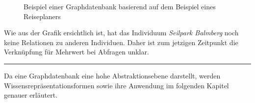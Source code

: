\begin{figure}[H]
\centering {}
\caption{Beispiel einer Graphdatenbank basierend auf dem Beispiel eines Reiseplaners\label{fig:protegebeispiel}\protect\footnotemark}
\end{figure}

Wie aus der Grafik ersichtlich ist, hat das Individuum \textit{Seilpark Balmberg} noch keine Relationen zu anderen Individuen. Daher ist zum jetzigen Zeitpunkt die Verknüpfung für Mehrwert bei Abfragen unklar.

\vspace{0.1pt}
\noindent\rule[1ex]{\textwidth}{1pt}

Da eine Graphdatenbank eine hohe Abstraktionsebene darstellt, werden Wissensrepräsentationsformen sowie ihre Anwendung im folgenden Kapitel genauer erläutert.
